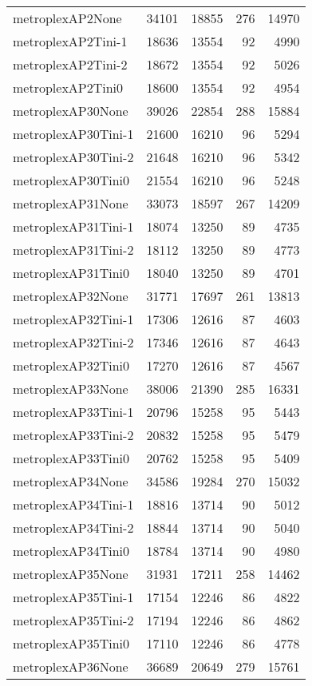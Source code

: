 \begin{longtable}{lrrrr}
metroplexAP2None & 34101 & 18855 & 276 & 14970 \\
metroplexAP2Tini-1 & 18636 & 13554 & 92 & 4990 \\
metroplexAP2Tini-2 & 18672 & 13554 & 92 & 5026 \\
metroplexAP2Tini0 & 18600 & 13554 & 92 & 4954 \\
metroplexAP30None & 39026 & 22854 & 288 & 15884 \\
metroplexAP30Tini-1 & 21600 & 16210 & 96 & 5294 \\
metroplexAP30Tini-2 & 21648 & 16210 & 96 & 5342 \\
metroplexAP30Tini0 & 21554 & 16210 & 96 & 5248 \\
metroplexAP31None & 33073 & 18597 & 267 & 14209 \\
metroplexAP31Tini-1 & 18074 & 13250 & 89 & 4735 \\
metroplexAP31Tini-2 & 18112 & 13250 & 89 & 4773 \\
metroplexAP31Tini0 & 18040 & 13250 & 89 & 4701 \\
metroplexAP32None & 31771 & 17697 & 261 & 13813 \\
metroplexAP32Tini-1 & 17306 & 12616 & 87 & 4603 \\
metroplexAP32Tini-2 & 17346 & 12616 & 87 & 4643 \\
metroplexAP32Tini0 & 17270 & 12616 & 87 & 4567 \\
metroplexAP33None & 38006 & 21390 & 285 & 16331 \\
metroplexAP33Tini-1 & 20796 & 15258 & 95 & 5443 \\
metroplexAP33Tini-2 & 20832 & 15258 & 95 & 5479 \\
metroplexAP33Tini0 & 20762 & 15258 & 95 & 5409 \\
metroplexAP34None & 34586 & 19284 & 270 & 15032 \\
metroplexAP34Tini-1 & 18816 & 13714 & 90 & 5012 \\
metroplexAP34Tini-2 & 18844 & 13714 & 90 & 5040 \\
metroplexAP34Tini0 & 18784 & 13714 & 90 & 4980 \\
metroplexAP35None & 31931 & 17211 & 258 & 14462 \\
metroplexAP35Tini-1 & 17154 & 12246 & 86 & 4822 \\
metroplexAP35Tini-2 & 17194 & 12246 & 86 & 4862 \\
metroplexAP35Tini0 & 17110 & 12246 & 86 & 4778 \\
metroplexAP36None & 36689 & 20649 & 279 & 15761 \\

\end{longtable}

